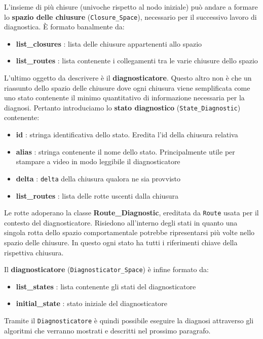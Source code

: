 L'insieme di più chisure (univoche rispetto al nodo iniziale) può andare a formare lo \textbf{spazio delle chiusure} (\texttt{Closure\_Space}), necessario per il successivo lavoro di diagnostica. È formato banalmente da:
\begin{itemize}
    \item \textbf{list\_closures} : lista delle chiusure appartenenti allo spazio
    \item \textbf{list\_routes} : lista contenente i collegamenti tra le varie chiusure dello spazio
\end{itemize}

L'ultimo oggetto da descrivere è il \textbf{diagnosticatore}. Questo altro non è che un riassunto dello spazio delle chiusure dove ogni chiusura viene semplificata come uno stato contenente il minimo quantitativo di informazione necessaria per la diagnosi. Pertanto introduciamo lo \textbf{stato diagnostico} (\texttt{State\_Diagnostic}) contenente:
\begin{itemize}
    \item \textbf{id} : stringa identificativa dello stato. Eredita l'id della chiusura relativa
    \item \textbf{alias} : stringa contenente il nome dello stato. Principalmente utile per stampare a video in modo leggibile il diagnosticatore
    \item \textbf{delta} : \texttt{delta} della chiusura qualora ne sia provvisto
    \item \textbf{list\_routes} : lista delle rotte uscenti dalla chiusura
\end{itemize}

Le rotte adoperano la classe \textbf{Route\_Diagnostic}, ereditata da \texttt{Route} usata per il contesto del diagnosticatore. Risiedono all'interno degli stati in quanto una singola rotta dello spazio comportamentale potrebbe ripresentarsi più volte nello spazio delle chiusure. In questo ogni stato ha tutti i riferimenti chiave della rispettiva chiusura.

Il \textbf{diagnosticatore} (\texttt{Diagnosticator\_Space}) è infine formato da:
\begin{itemize}
    \item \textbf{list\_states} : lista contenente gli stati del diagnosticatore
    \item \textbf{initial\_state} : stato iniziale del diagnosticatore
\end{itemize}
Tramite il \texttt{Diagnosticatore} è quindi possibile eseguire la diagnosi attraverso gli algoritmi che verranno mostrati e descritti nel prossimo paragrafo.

